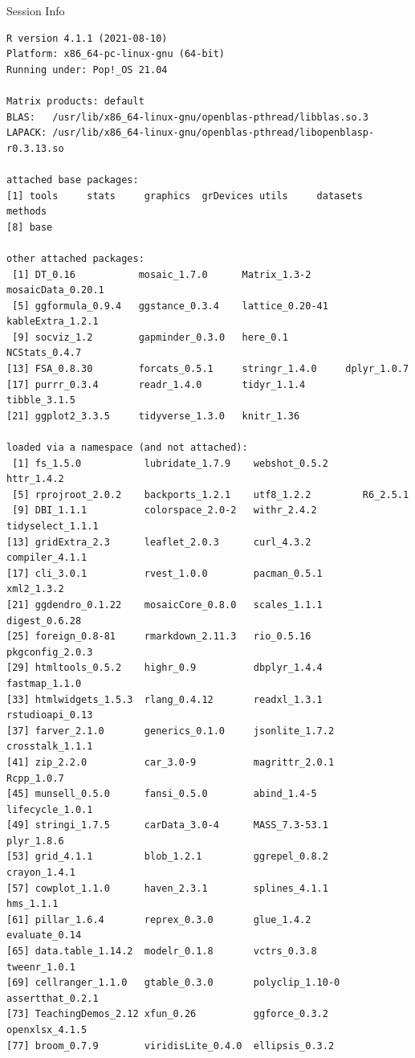 \documentclass[10pt]{beamer}\usepackage[]{graphicx}\usepackage[]{color}
\makeatletter
\newenvironment{kframe}{%
 \def\at@end@of@kframe{}%
 \ifinner\ifhmode%
  \def\at@end@of@kframe{\end{minipage}}%
  \begin{minipage}{\columnwidth}%
 \fi\fi%
 \def\FrameCommand##1{\hskip\@totalleftmargin \hskip-\fboxsep
 \colorbox{shadecolor}{##1}\hskip-\fboxsep
     \hskip-\linewidth \hskip-\@totalleftmargin \hskip\columnwidth}%
 \MakeFramed {\advance\hsize-\width
   \@totalleftmargin\z@ \linewidth\hsize
   \@setminipage}}%
 {\par\unskip\endMakeFramed%
 \at@end@of@kframe}
\newenvironment{knitrout}{}{} %
\makeatother
\begin{document}
\begin{frame}[fragile]{Session Info}
	\tiny
	
\begin{knitrout}\tiny
{}\color{fgcolor}\begin{kframe}
\begin{verbatim}
R version 4.1.1 (2021-08-10)
Platform: x86_64-pc-linux-gnu (64-bit)
Running under: Pop!_OS 21.04

Matrix products: default
BLAS:   /usr/lib/x86_64-linux-gnu/openblas-pthread/libblas.so.3
LAPACK: /usr/lib/x86_64-linux-gnu/openblas-pthread/libopenblasp-r0.3.13.so

attached base packages:
[1] tools     stats     graphics  grDevices utils     datasets  methods  
[8] base     

other attached packages:
 [1] DT_0.16           mosaic_1.7.0      Matrix_1.3-2      mosaicData_0.20.1
 [5] ggformula_0.9.4   ggstance_0.3.4    lattice_0.20-41   kableExtra_1.2.1 
 [9] socviz_1.2        gapminder_0.3.0   here_0.1          NCStats_0.4.7    
[13] FSA_0.8.30        forcats_0.5.1     stringr_1.4.0     dplyr_1.0.7      
[17] purrr_0.3.4       readr_1.4.0       tidyr_1.1.4       tibble_3.1.5     
[21] ggplot2_3.3.5     tidyverse_1.3.0   knitr_1.36       

loaded via a namespace (and not attached):
 [1] fs_1.5.0           lubridate_1.7.9    webshot_0.5.2      httr_1.4.2        
 [5] rprojroot_2.0.2    backports_1.2.1    utf8_1.2.2         R6_2.5.1          
 [9] DBI_1.1.1          colorspace_2.0-2   withr_2.4.2        tidyselect_1.1.1  
[13] gridExtra_2.3      leaflet_2.0.3      curl_4.3.2         compiler_4.1.1    
[17] cli_3.0.1          rvest_1.0.0        pacman_0.5.1       xml2_1.3.2        
[21] ggdendro_0.1.22    mosaicCore_0.8.0   scales_1.1.1       digest_0.6.28     
[25] foreign_0.8-81     rmarkdown_2.11.3   rio_0.5.16         pkgconfig_2.0.3   
[29] htmltools_0.5.2    highr_0.9          dbplyr_1.4.4       fastmap_1.1.0     
[33] htmlwidgets_1.5.3  rlang_0.4.12       readxl_1.3.1       rstudioapi_0.13   
[37] farver_2.1.0       generics_0.1.0     jsonlite_1.7.2     crosstalk_1.1.1   
[41] zip_2.2.0          car_3.0-9          magrittr_2.0.1     Rcpp_1.0.7        
[45] munsell_0.5.0      fansi_0.5.0        abind_1.4-5        lifecycle_1.0.1   
[49] stringi_1.7.5      carData_3.0-4      MASS_7.3-53.1      plyr_1.8.6        
[53] grid_4.1.1         blob_1.2.1         ggrepel_0.8.2      crayon_1.4.1      
[57] cowplot_1.1.0      haven_2.3.1        splines_4.1.1      hms_1.1.1         
[61] pillar_1.6.4       reprex_0.3.0       glue_1.4.2         evaluate_0.14     
[65] data.table_1.14.2  modelr_0.1.8       vctrs_0.3.8        tweenr_1.0.1      
[69] cellranger_1.1.0   gtable_0.3.0       polyclip_1.10-0    assertthat_0.2.1  
[73] TeachingDemos_2.12 xfun_0.26          ggforce_0.3.2      openxlsx_4.1.5    
[77] broom_0.7.9        viridisLite_0.4.0  ellipsis_0.3.2    
\end{verbatim}
\end{kframe}
\end{knitrout}
	
\end{frame}
\end{document}
